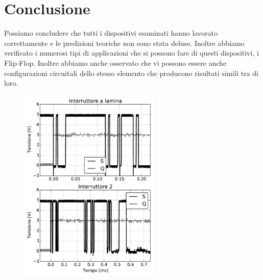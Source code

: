 \section*{Conclusione}

Possiamo concludere che tutti i dispositivi esaminati hanno lavorato correttamente e le predizioni teoriche non sono stata deluse. Inoltre abbiamo verificato i numerosi tipi di applicazioni che si possono fare di questi dispositivi, i Flip-Flop. Inoltre abbiamo anche osservato che vi possono essere anche configurazioni circuitali dello stesso elemento che producono risultati simili tra di loro.

\begin{figure}[h]
	\centering
	\includegraphics[width=0.6\textwidth]{figure/rimb.pdf}
	\caption{}
	\label{fig:rimbalzo}
\end{figure}